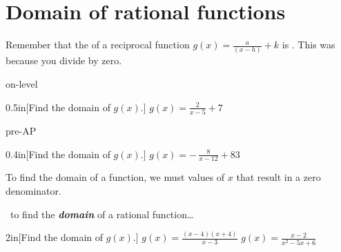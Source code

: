 \section{Domain of rational functions}

Remember 
that the  of a reciprocal function $g(x) = \frac{a}{(x-h)} + k$ is .
This was because you  divide by zero.


\begin{taggedblock}{on-level}
    \begin{myWideProblem}{0.5in}[Find the domain of $g(x)$.]
        {
            $g(x) = \frac{2}{x-5} + 7$
        }
    \end{myWideProblem}
    \vspace{1em}
\end{taggedblock}
\begin{taggedblock}{pre-AP}
    \begin{myWideProblem}{0.4in}[Find the domain of $g(x)$.]
        {
            $g(x) = -\,\frac{8}{x-12} + 83$
        }
    \end{myWideProblem}
    \vspace{1em}
\end{taggedblock}



To find the domain of a  function, we must  values of $x$ that result in a zero denominator.

\begin{myConceptSteps}{~to find the {\bfseries\itshape domain} of a rational function\dots}
\end{myConceptSteps}

\begin{my2Problems}{2in}[Find the domain of $g(x)$.]
    {
        $g(x) = \frac{(x-4)(x+4)}{x-3}$
    }
    {
        $g(x) = \frac{x-2}{x^2 - 5x + 6}$
    }
\end{my2Problems}
